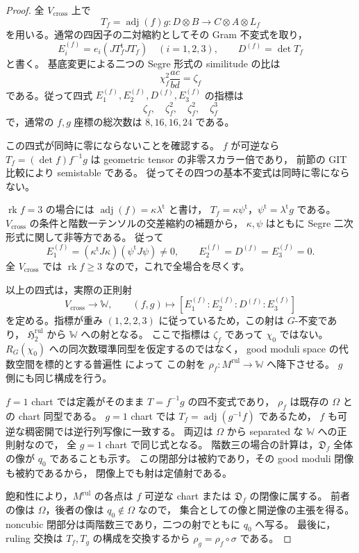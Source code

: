 \begin{proof}
全 $V_{\mathrm{cross}}$ 上で
\[
 T_f=\operatorname{adj}(f)g:
      D\otimes B\longrightarrow C\otimes A\otimes L_f
\]
を用いる。通常の四因子の二対縮約としてその Gram 不変式を取り，
\[
 E_i^{(f)}=e_i(JT_f^{\mathrm{t}}JT_f)\quad(i=1,2,3),
 \qquad D^{(f)}=\det T_f
\]
と書く。
基底変更による二つの Segre 形式の similitude の比は
\[
 \chi_f^2\frac{ac}{bd}=\zeta_f
\]
である。従って四式
$E_1^{(f)},E_2^{(f)},D^{(f)},E_3^{(f)}$ の指標は
\[
 \zeta_f,\quad\zeta_f^2,\quad\zeta_f^2,\quad\zeta_f^3
\]
で，通常の $f,g$ 座標の総次数は $8,16,16,24$ である。

この四式が同時に零にならないことを確認する。
$f$ が可逆なら
$T_f=(\det f)f^{-1}g$ は geometric tensor の非零スカラー倍であり，
前節の GIT 比較により semistable である。
従ってその四つの基本不変式は同時に零にならない。

$\operatorname{rk}f=3$ の場合には
$\operatorname{adj}(f)=\kappa\lambda^{\mathrm{t}}$ と書け，
$T_f=\kappa\psi^{\mathrm{t}}$，$\psi^{\mathrm{t}}=\lambda^{\mathrm{t}}g$ である。
$V_{\mathrm{cross}}$ の条件と階数一テンソルの交差縮約の補題から，
$\kappa,\psi$ はともに Segre 二次形式に関して非等方である。
従って
\[
 E_1^{(f)}=(\kappa^{\mathrm{t}}J\kappa)(\psi^{\mathrm{t}}J\psi)\ne0,
 \qquad E_2^{(f)}=D^{(f)}=E_3^{(f)}=0.
\]
全 $V_{\mathrm{cross}}$ では $\operatorname{rk}f\ge3$ なので，これで全場合を尽くす。

以上の四式は，実際の正則射
\[
 V_{\mathrm{cross}}\longrightarrow\mathbb W,
 \qquad
 (f,g)\longmapsto
 [E_1^{(f)}:E_2^{(f)}:D^{(f)}:E_3^{(f)}]
\]
を定める。指標が重み $(1,2,2,3)$ に従っているため，この射は $G$-不変であり，
$\mathfrak H_2^{\mathrm{rul}}$ から $\mathbb W$ への射となる。
ここで指標は $\zeta_f$ であって $\chi_0$ ではない。
$R_G(\chi_0)$ への同次数環準同型を仮定するのではなく，
good moduli space の代数空間を標的とする普遍性
\cite[Theorem 6.6]{AlperGoodModuli2013} によって
この射を $\rho_f:M^{\mathrm{rul}}\to\mathbb W$ へ降下させる。
$g$ 側にも同じ構成を行う。

$f=1$ chart では定義がそのまま $T=f^{-1}g$ の四不変式であり，
$\rho_f$ は既存の $\Omega$ との chart 同型である。
$g=1$ chart では $T_f=\operatorname{adj}(g^{-1}f)$ であるため，
$f$ も可逆な稠密開では逆行列写像に一致する。
両辺は $\Omega$ から separated な $\mathbb W$ への正則射なので，
全 $g=1$ chart で同じ式となる。
階数三の場合の計算は，$\mathfrak D_f$ 全体の像が $q_0$ であることも示す。
この閉部分は被約であり，その good moduli 閉像も被約であるから，
閉像上でも射は定値射である。

飽和性により，$M^{\mathrm{rul}}$ の各点は
$f$ 可逆な chart または $\mathfrak D_f$ の閉像に属する。
前者の像は $\Omega$，後者の像は $q_0\notin\Omega$ なので，
集合としての像と開逆像の主張を得る。
noncubic 閉部分は両階数三であり，二つの射でともに $q_0$ へ写る。
最後に，ruling 交換は $T_f,T_g$ の構成を交換するから
$\rho_g=\rho_f\circ\sigma$ である。
\end{proof}

